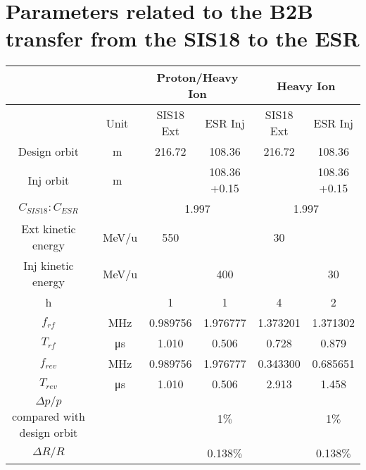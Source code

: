 \newpage
\section{Parameters related to the B2B transfer from the SIS18 to the ESR}
\label{sec:18toESR}



% 
    \begin{longtable}{ | c | c | c | c | c | c |}
    \hline
		\rowcolor[gray]{0.8}
     	 &  & \multicolumn{2}{c|}{Proton/Heavy Ion} & \multicolumn{2}{c|}{Heavy Ion} \\ \hline
		 & Unit &	SIS18 Ext & ESR Inj & SIS18 Ext &	ESR Inj\\ \hline
Design orbit &	m &	 216.72&108.36&	216.72&108.36	\\ \hline
Inj orbit &	m &	 &\tabincell{c}{108.36\\+0.15}&	&\tabincell{c}{108.36\\+0.15}	\\ \hline
$C_{SIS18}:C_{ESR}$&	&	\multicolumn{2}{c|}{1.997}&\multicolumn{2}{c|}{1.997}	\\ \hline
\tabincell{c}{Ext kinetic\\ energy}&	\SI{}{\MeV/\atomicmassunit}&	550 & &30&	\\ \hline
\tabincell{c}{Inj kinetic\\ energy}&	\SI{}{\MeV/\atomicmassunit}&	&400&	&30	\\ \hline
  h&	&1&1&4&2	\\ \hline
$f_{rf}$&\SI{}{\MHz}&	0.989756&1.976777&1.373201&1.371302	\\ \hline
$T_{rf}$&\SI{}{\us}&	1.010&0.506&0.728&0.879\\ \hline
$f_{rev}$&\SI{}{\MHz}&	0.989756&1.976777&0.343300&0.685651\\ \hline
$T_{rev}$&\SI{}{\us}&	1.010&0.506&2.913&1.458\\ \hline
\tabincell{c}{$\Delta p/p$ compared \\with design orbit}&	&&1$\%$&&1$\%$\\ \hline
$\Delta R/R$&	&&0.138$\%$&&0.138$\%$\\ \hline

\end{longtable}
